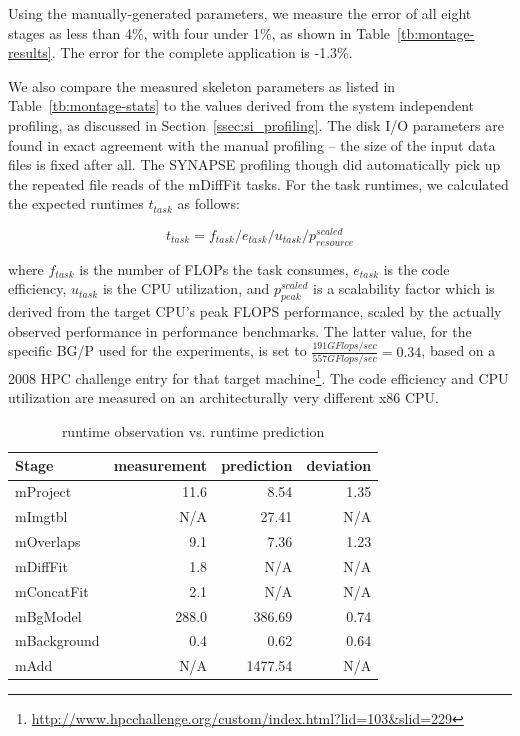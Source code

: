 \documentclass[preprint,12pt]{elsarticle}
\begin{document}
Using the manually-generated parameters, we measure the error of all eight stages as less than 4\%, with four under 1\%, as shown in Table~\ref{tb:montage-results}. The error for the complete application is -1.3\%.

We also compare the measured skeleton parameters as listed in
Table~\ref{tb:montage-stats} to the values derived from the system
independent profiling, as discussed in Section~\ref{ssec:si_profiling}. 
The disk I/O parameters are found in exact agreement with the manual
profiling -- the size of the input data files is fixed after all.
The SYNAPSE profiling though did automatically pick up the repeated file
reads of the mDiffFit tasks.  For the task runtimes, we calculated the
expected runtimes $t_{task}$ as follows:
 
$$
  t_{task} = f_{task} / e_{task} / u_{task} / p_{resource}^{scaled} 
$$

where $f_{task}$ is the number of FLOPs the task consumes, $e_{task}$
is the code efficiency, $u_{task}$ is the CPU utilization, and
$p_{peak}^{scaled}$ is a scalability factor which is derived from the
target CPU's peak FLOPS performance, scaled by the actually observed
performance in performance benchmarks.  The latter value, for the
specific BG/P used for the experiments, is set to 
$\frac{191 GFlops/sec}{557 GFlops/sec} = 0.34$,
based on a 2008 HPC challenge entry for that
target
machine\footnote{\url{http://www.hpcchallenge.org/custom/index.html?lid=103&slid=229}}.
The code efficiency and CPU utilization are measured on an
architecturally very different x86 CPU.

\begin{table}[t]
\begin{center}
    \caption{runtime observation vs. runtime prediction}
    \begin{scriptsize}
    \begin{tabular}{|l|r|r|r|}
    \hline
    Stage       & measurement & prediction &  deviation \\\hline
	mProject    &        11.6 &       8.54 &       1.35 \\ \hline
	mImgtbl     &         N/A &      27.41 &        N/A \\ \hline
	mOverlaps   &         9.1 &       7.36 &       1.23 \\ \hline
	mDiffFit    &         1.8 &        N/A &        N/A \\ \hline
	mConcatFit  &         2.1 &        N/A &        N/A \\ \hline
	mBgModel    &       288.0 &     386.69 &       0.74 \\ \hline
	mBackground &         0.4 &       0.62 &       0.64 \\ \hline
	mAdd        &         N/A &    1477.54 &        N/A \\ \hline
    \end{tabular}
    \end{scriptsize}
    \label{tb:prof-compare}
\end{center}   
\end{table}
\end{document}
